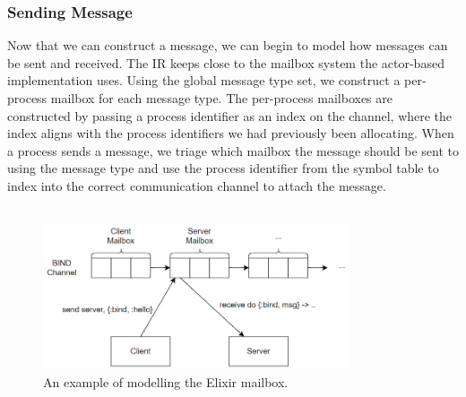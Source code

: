 \subsubsection{Sending Message}
Now that we can construct a message, we can begin to model how messages can be sent and received. The IR keeps close to the mailbox system the actor-based implementation uses. Using the global message type set, we construct a per-process mailbox for each message type. The per-process mailboxes are constructed by passing a process identifier as an index on the channel, where the index aligns with the process identifiers we had previously been allocating. When a process sends a message, we triage which mailbox the message should be sent to using the message type and use the process identifier from the symbol table to index into the correct communication channel to attach the message.
\\ \\
\begin{figure}[h]
    \centering
    \includegraphics[width=0.8\textwidth]{images/promela_messages.png}
    \caption{An example of modelling the Elixir mailbox.}
    \label{fig:promela_mailbox}
\end{figure}
\\ \\
